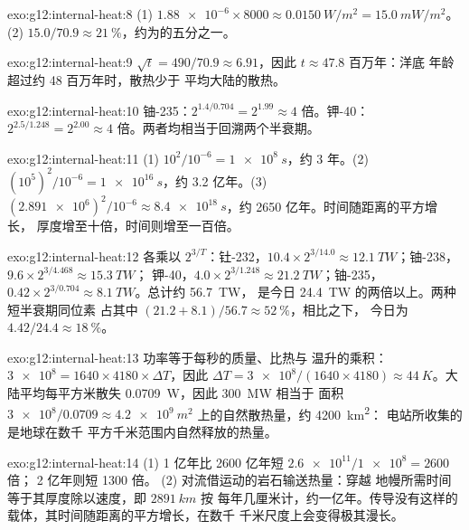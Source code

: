 \begin{solution}{exo:g12:internal-heat:8}
(1) $\num{1.88e-6} \times 8000 \approx \qty{0.0150}{W/m^2} = \qty{15.0}{mW/m^2}$。
(2) $15.0/70.9 \approx \qty{21}{\percent}$，约为的五分之一。
\end{solution}

\begin{solution}{exo:g12:internal-heat:9}
$\sqrt{t} = 490/70.9 \approx 6.91$，因此 $t \approx 47.8$ 百万年：洋底
年龄超过约 48 百万年时，散热少于
平均大陆的散热。
\end{solution}

\begin{solution}{exo:g12:internal-heat:10}
铀-235：$2^{1.4/0.704} = 2^{1.99} \approx 4$ 倍。钾-40：
$2^{2.5/1.248} = 2^{2.00} \approx 4$ 倍。两者均相当于回溯两个半衰期。
\end{solution}

\begin{solution}{exo:g12:internal-heat:11}
(1) $10^2/10^{-6} = \qty{1e8}{s}$，约 3 年。(2) $(10^5)^2/10^{-6} =
\qty{1e16}{s}$，约 3.2 亿年。(3) $(\num{2.891e6})^2/10^{-6}
\approx \qty{8.4e18}{s}$，约 2650 亿年。时间随距离的平方增长，
厚度增至十倍，时间则增至一百倍。
\end{solution}

\begin{solution}{exo:g12:internal-heat:12}
各乘以 $2^{3/T}$：钍-232，$10.4 \times 2^{3/14.0} \approx
\qty{12.1}{TW}$；铀-238，$9.6 \times 2^{3/4.468} \approx \qty{15.3}{TW}$；
钾-40，$4.0 \times 2^{3/1.248} \approx \qty{21.2}{TW}$；铀-235，
$0.42 \times 2^{3/0.704} \approx \qty{8.1}{TW}$。总计约 \qty{56.7}{TW}，
是今日 \qty{24.4}{TW} 的两倍以上。两种短半衰期同位素
占其中 $(21.2 + 8.1)/56.7 \approx \qty{52}{\percent}$，相比之下，
今日为 $4.42/24.4 \approx \qty{18}{\percent}$。
\end{solution}

\begin{solution}{exo:g12:internal-heat:13}
功率等于每秒的质量、比热与
温升的乘积：$\num{3e8} = 1640 \times 4180 \times \Delta T$，因此 $\Delta T =
\num{3e8}/(1640 \times 4180) \approx \qty{44}{K}$。大陆平均每平方米散失
\qty{0.0709}{W}，因此 \qty{300}{MW} 相当于
面积 $\num{3e8}/0.0709 \approx \qty{4.2e9}{m^2}$ 上的自然散热量，约 \qty{4200}{km^2}：
电站所收集的是地球在数千
平方千米范围内自然释放的热量。
\end{solution}

\begin{solution}{exo:g12:internal-heat:14}
(1) 1 亿年比 2600 亿年短 $\num{2.6e11}/\num{1e8} = 2600$ 倍；
2 亿年则短 1300 倍。
(2) 对流借运动的岩石输送热量：穿越
地幔所需时间等于其厚度除以速度，即 $\qty{2891}{km}$ 按
每年几厘米计，约一亿年。传导没有这样的
载体，其时间随距离的平方增长，在数千
千米尺度上会变得极其漫长。
\end{solution}

